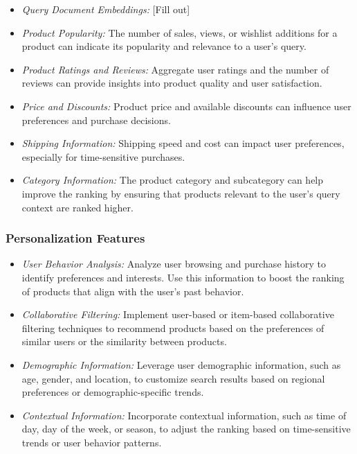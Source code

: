 \documentclass[12pt]{article}
\begin{document}
    \begin{itemize}
    	\item \textit{Query Document Embeddings:} [Fill out]
        \item \textit{Product Popularity:} The number of sales, views, or wishlist additions for a product can indicate its popularity and relevance to a user's query.
        
        \item \textit{Product Ratings and Reviews:} Aggregate user ratings and the number of reviews can provide insights into product quality and user satisfaction.
        
        \item \textit{Price and Discounts:} Product price and available discounts can influence user preferences and purchase decisions.
        
        \item \textit{Shipping Information:} Shipping speed and cost can impact user preferences, especially for time-sensitive purchases.
        
        \item \textit{Category Information:} The product category and subcategory can help improve the ranking by ensuring that products relevant to the user's query context are ranked higher.
    \end{itemize}

\subsubsection{Personalization Features}

    \begin{itemize}
        \item \textit{User Behavior Analysis:} Analyze user browsing and purchase history to identify preferences and interests. Use this information to boost the ranking of products that align with the user's past behavior.

        \item \textit{Collaborative Filtering:} Implement user-based or item-based collaborative filtering techniques to recommend products based on the preferences of similar users or the similarity between products.

        \item \textit{Demographic Information:} Leverage user demographic information, such as age, gender, and location, to customize search results based on regional preferences or demographic-specific trends.

        \item \textit{Contextual Information:} Incorporate contextual information, such as time of day, day of the week, or season, to adjust the ranking based on time-sensitive trends or user behavior patterns.
    \end{itemize}
\end{document}

